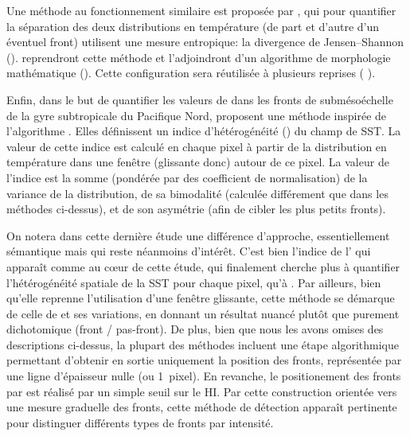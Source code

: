 Une méthode au fonctionnement similaire est proposée par \textcite{vazquez_1999}, qui pour quantifier la séparation des deux distributions en température (de part et d'autre d'un éventuel front) utilisent une mesure entropique: la divergence de Jensen--Shannon (\cite{barranco-lopez_1995}).
\textcite{shimada_2005} reprendront cette méthode et l'adjoindront d'un algorithme de morphologie mathématique (\cite{jiang_1997}).
Cette configuration sera réutilisée à plusieurs reprises (\cite{lan_2012} ).

Enfin, dans le but de quantifier les valeurs de  dans les fronts de submésoéchelle de la gyre subtropicale du Pacifique Nord, \textcite{liu_2016} proposent une méthode inspirée de l'algorithme .
Elles définissent un indice d'hétérogénéité () du champ de SST.
La valeur de cette indice est calculé en chaque pixel à partir de la distribution en température dans une fenêtre (glissante donc) autour de ce pixel.
La valeur de l'indice est la somme (pondérée par des coefficient de normalisation) de la variance de la distribution, de sa bimodalité (calculée différement que dans les méthodes ci-dessus), et de son asymétrie (afin de cibler les plus petits fronts).

On notera dans cette dernière étude une différence d'approche, essentiellement sémantique mais qui reste néanmoins d'intérêt.
C'est bien l'indice de l' qui apparaît comme au cœur de cette étude, qui finalement cherche plus à quantifier l'hétérogénéité spatiale de la SST pour chaque pixel, qu'à .
Par ailleurs, bien qu'elle reprenne l'utilisation d'une fenêtre glissante, cette méthode se démarque de celle de  et ses variations, en donnant un résultat nuancé plutôt que purement dichotomique (front / pas-front).
De plus, bien que nous les avons omises des descriptions ci-dessus, la plupart des méthodes incluent une étape algorithmique permettant d'obtenir en sortie uniquement la position des fronts, représentée par une ligne d'épaisseur nulle (ou 1~pixel).
En revanche, le positionement des fronts par \citeauthor{liu_2016} est réalisé par un simple\footnotemark{} seuil sur le HI.
Par cette construction orientée vers une mesure graduelle des fronts, cette méthode de détection apparaît pertinente pour distinguer différents types de fronts par intensité.


